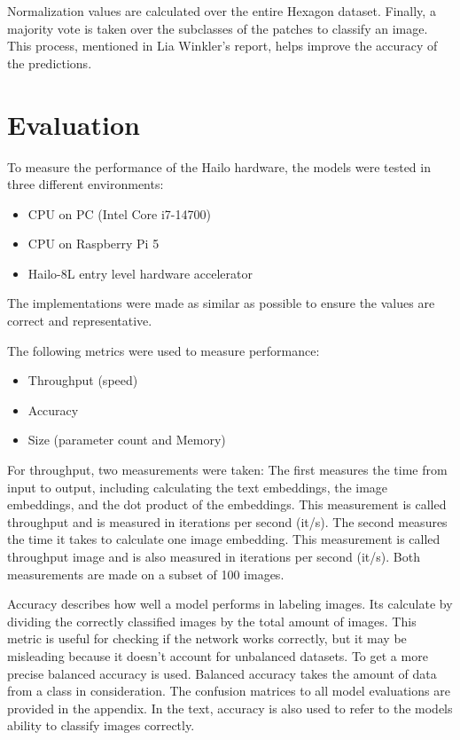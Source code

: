 Normalization values are calculated over the entire Hexagon dataset.
Finally, a majority vote is taken over the subclasses of the patches to classify an image. 
This process, mentioned in Lia Winkler's report, helps improve the accuracy of the predictions.

\section{Evaluation}

To measure the performance of the Hailo hardware, the models were tested in three different environments:
\begin{itemize}
    \item CPU on PC (Intel Core i7-14700)
    \item CPU on Raspberry Pi 5
    \item Hailo-8L entry level hardware accelerator
\end{itemize}
The implementations were made as similar as possible to ensure the values are correct and representative. 

The following metrics were used to measure performance:
\begin{itemize}
    \item Throughput (speed)
    \item Accuracy
    \item Size (parameter count and Memory)
\end{itemize}

For throughput, two measurements were taken:
The first measures the time from input to output, including calculating the text embeddings, the image embeddings, and the dot product of the embeddings. This measurement is called throughput and is measured in iterations per second (it/s).
The second measures the time it takes to calculate one image embedding. This measurement is called throughput image and is also measured in iterations per second (it/s).
Both measurements are made on a subset of 100 images.

Accuracy describes how well a model performs in labeling images.
Its calculate by dividing the correctly classified images by the total amount of images.
This metric is useful for checking if the network works correctly, but it may be misleading because it doesn't account for unbalanced datasets.
To get a more precise balanced accuracy is used.
Balanced accuracy takes the amount of data from a class in consideration.
The confusion matrices to all model evaluations are provided in the appendix.
In the text, accuracy is also used to refer to the models ability to classify images correctly.


